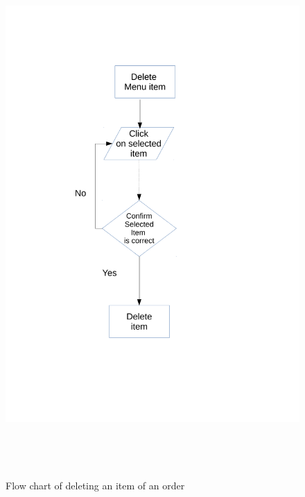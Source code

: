 \begin{figure}[H]
    \includegraphics[height = 20cm]{./Design/Images/flowchart3}
    \caption{Flow chart of deleting an item of an order} \label{fig:Flowchart3}
\end{figure}

